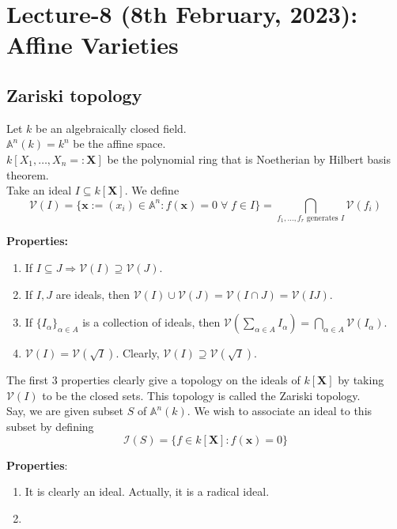 \documentclass[oneside, 12pt]{scrbook}
\newcommand{\V}{\mathcal{V}}
\newcommand{\I}{\mathcal{I}}
\newcommand{\Aa}{\mathbb{A}}
\newcommand{\ds}{\displaystyle}
\theoremstyle{theorem}
\begin{document}
\chapter{Lecture-8 (8th February, 2023): Affine Varieties }

\section{Zariski topology }

Let $k$ be an algebraically closed field. \\

$\Aa^n (k) = k^n$ be the affine space. \\

$k[X_{1}, \hdots , X_{n}=: \mathbf{X}]$ be the polynomial ring that is Noetherian by Hilbert basis theorem. \\

Take an ideal $I \subseteq k [\mathbf{X}]$. We define $$\V (I) = \{\mathbf{x} :=(x_{i}) \in \Aa^n: f(\mathbf{x})=0 \; \forall \; f\in I \} = \bigcap_{f_{1}, \hdots , f_{r} \text{ generates } I} \V(f_{i})$$


\textbf{Properties:}
\begin{enumerate}
\item If $I \subseteq J \Rightarrow \V(I) \supseteq \V(J)$.
\item If $I,J$ are ideals, then $\V(I) \cup \V(J) = \V(I \cap J) = \V(IJ)$. 
\item If $\{I_{\alpha}\}_{\alpha \in A}$ is a collection of ideals, then $\V(\sum_{\alpha \in A} I_{\alpha}) = \ds{\bigcap_{\alpha \in A} \V(I_{\alpha})}$.
\item $\V(I) = \V(\sqrt{I})$. Clearly, $\V(I) \supseteq \V(\sqrt{I})$.
\end{enumerate} 

The first $3$ properties clearly give a topology on the ideals of $k[\mathbf{X}]$ by taking $\V(I)$ to be the closed sets. This topology is called the Zariski topology.\\

Say, we are given subset $S$ of $\Aa^n(k)$. We wish to associate an ideal to this subset by defining $$\I(S)= \{f \in k [\mathbf{X}] : f(\mathbf{x})=0\}$$

\textbf{Properties}:
\begin{enumerate}
\item It is clearly an ideal. Actually, it is a radical ideal. 
\item 
\end{enumerate}
\end{document}
